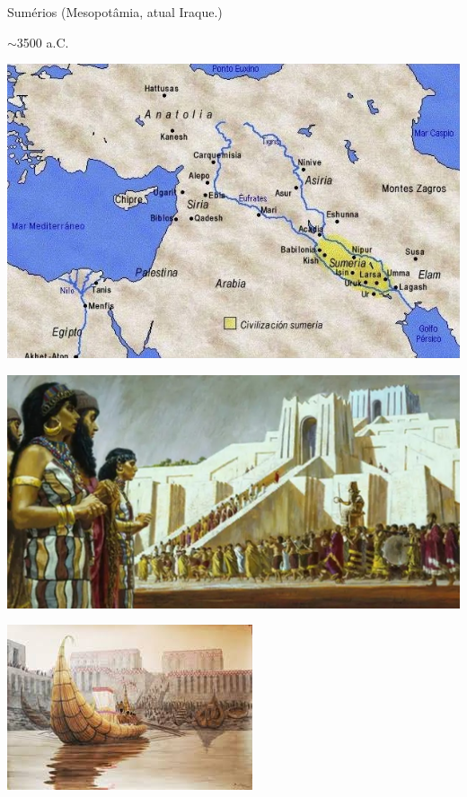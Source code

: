 
\begin{multicols}{2}
\large Sumérios (Mesopotâmia, atual Iraque.)

$\sim$3500 a.C.

\vfill\null
\columnbreak

\begin{center}
	\includegraphics[width=\linewidth]{./IMG/sumeria.jpg}
\end{center}
\end{multicols}	
\vfill
\pagebreak

\begin{center}
	\includegraphics[width=\linewidth]{./IMG/1_62aXcnbpy4HJKcEGK0p6dQ.jpg}
\end{center}

\vfill
\pagebreak

\begin{center}
	\includegraphics[width=\linewidth]{./IMG/barcos-sumerios.jpeg}
\end{center}

